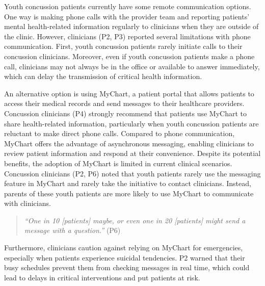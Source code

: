 Youth concussion patients currently have some remote communication options. One way is making phone calls with the provider team and reporting patients' mental health-related information regularly to clinicians when they are outside of the clinic. 
However, clinicians (P2, P3) reported several limitations with phone communication. First, youth concussion patients rarely initiate calls to their concussion clinicians. Moreover, even if youth concussion patients make a phone call, clinicians may not always be in the office or available to answer immediately, which can delay the transmission of critical health information.

An alternative option is using MyChart, a patient portal that allows patients to access their medical records and send messages to their healthcare providers. 
Concussion clinicians (P4) strongly recommend that patients use MyChart to share health-related information, particularly when youth concussion patients are reluctant to make direct phone calls. 
Compared to phone communication, MyChart offers the advantage of asynchronous messaging, enabling clinicians to review patient information and respond at their convenience. 
Despite its potential benefits, the adoption of MyChart is limited in current clinical scenarios.
Concussion clinicians (P2, P6) noted that youth patients rarely use the messaging feature in MyChart and rarely take the initiative to contact clinicians.
Instead, parents of these youth patients are more likely to use MyChart to communicate with clinicians.

\begin{quote}
    \textit{``One in 10 [patients] maybe, or even one in 20 [patients] might send a message with a question.''} (P6)
\end{quote}

Furthermore, clinicians caution against relying on MyChart for emergencies, especially when patients experience suicidal tendencies. 
P2 warned that their busy schedules prevent them from checking messages in real time, which could lead to delays in critical interventions and put patients at risk.

